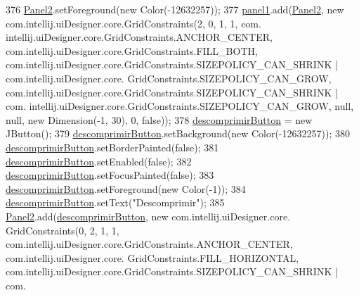 \begin{DoxyCode}
376         \hyperlink{classpresentacion_1_1form_1_1mainForm_a40e87b5e341114287b070012a4aadc8f}{Panel2}.setForeground(\textcolor{keyword}{new} Color(-12632257));
377         \hyperlink{classpresentacion_1_1form_1_1mainForm_aa43e009cc6dc09d4e637385fbd361510}{panel1}.add(\hyperlink{classpresentacion_1_1form_1_1mainForm_a40e87b5e341114287b070012a4aadc8f}{Panel2}, \textcolor{keyword}{new} com.intellij.uiDesigner.core.GridConstraints(2, 0, 1, 1, com.
      intellij.uiDesigner.core.GridConstraints.ANCHOR\_CENTER, com.intellij.uiDesigner.core.GridConstraints.FILL\_BOTH,
       com.intellij.uiDesigner.core.GridConstraints.SIZEPOLICY\_CAN\_SHRINK | com.intellij.uiDesigner.core.
      GridConstraints.SIZEPOLICY\_CAN\_GROW, com.intellij.uiDesigner.core.GridConstraints.SIZEPOLICY\_CAN\_SHRINK | com.
      intellij.uiDesigner.core.GridConstraints.SIZEPOLICY\_CAN\_GROW, null, null, \textcolor{keyword}{new} Dimension(-1, 30), 0, \textcolor{keyword}{false}));
378         \hyperlink{classpresentacion_1_1form_1_1mainForm_a336e6855f8a19241d02376d4ff6a1802}{descomprimirButton} = \textcolor{keyword}{new} JButton();
379         \hyperlink{classpresentacion_1_1form_1_1mainForm_a336e6855f8a19241d02376d4ff6a1802}{descomprimirButton}.setBackground(\textcolor{keyword}{new} Color(-12632257));
380         \hyperlink{classpresentacion_1_1form_1_1mainForm_a336e6855f8a19241d02376d4ff6a1802}{descomprimirButton}.setBorderPainted(\textcolor{keyword}{false});
381         \hyperlink{classpresentacion_1_1form_1_1mainForm_a336e6855f8a19241d02376d4ff6a1802}{descomprimirButton}.setEnabled(\textcolor{keyword}{false});
382         \hyperlink{classpresentacion_1_1form_1_1mainForm_a336e6855f8a19241d02376d4ff6a1802}{descomprimirButton}.setFocusPainted(\textcolor{keyword}{false});
383         \hyperlink{classpresentacion_1_1form_1_1mainForm_a336e6855f8a19241d02376d4ff6a1802}{descomprimirButton}.setForeground(\textcolor{keyword}{new} Color(-1));
384         \hyperlink{classpresentacion_1_1form_1_1mainForm_a336e6855f8a19241d02376d4ff6a1802}{descomprimirButton}.setText(\textcolor{stringliteral}{"Descomprimir"});
385         \hyperlink{classpresentacion_1_1form_1_1mainForm_a40e87b5e341114287b070012a4aadc8f}{Panel2}.add(\hyperlink{classpresentacion_1_1form_1_1mainForm_a336e6855f8a19241d02376d4ff6a1802}{descomprimirButton}, \textcolor{keyword}{new} com.intellij.uiDesigner.core.
      GridConstraints(0, 2, 1, 1, com.intellij.uiDesigner.core.GridConstraints.ANCHOR\_CENTER, com.intellij.uiDesigner.core.
      GridConstraints.FILL\_HORIZONTAL, com.intellij.uiDesigner.core.GridConstraints.SIZEPOLICY\_CAN\_SHRINK | com.

\end{DoxyCode}
